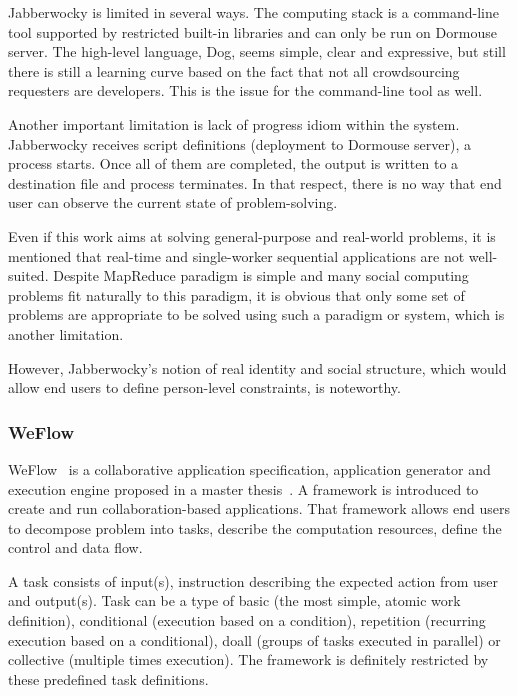 Jabberwocky is limited in several ways. The computing stack is a command-line 
tool supported by restricted built-in libraries and can only be run on Dormouse server. 
The high-level language, Dog, seems simple, clear and expressive, but still there is 
still a learning curve based on the fact that not all crowdsourcing requesters are 
developers. This is the issue for the command-line tool as well.

Another important limitation is lack of progress idiom within the system. 
Jabberwocky receives script definitions (deployment to Dormouse server), 
a process starts. Once all of them are completed, the output is written to a destination 
file and process terminates. In that respect, there is no way that end user can 
observe the current state of problem-solving.

Even if this work aims at solving general-purpose and real-world problems, 
it is mentioned that real-time and single-worker sequential applications are not 
well-suited. Despite MapReduce paradigm is simple and many social computing 
problems fit naturally to this paradigm, it is obvious that only some set of problems are 
appropriate to be solved using such a paradigm or system, which is another limitation. 

However, Jabberwocky's notion of real identity and social structure, 
which would allow end users to define person-level constraints, is noteworthy.



\subsubsection{WeFlow}
WeFlow~\cite{Kokciyan2012} is a collaborative application specification, 
application generator and execution engine proposed in a master thesis~\cite{Kokciyan}. 
A framework is introduced to create and run collaboration-based applications. 
That framework allows end users to decompose problem into tasks, 
describe the computation resources, define the control and data flow.

A task consists of input(s), instruction describing the expected action from user 
and output(s). Task can be a type of basic (the most simple, atomic work definition), 
conditional (execution based on a condition), repetition (recurring execution based 
on a conditional), doall (groups of tasks executed in parallel) or collective 
(multiple times execution). The framework is definitely restricted by 
these predefined task definitions.

